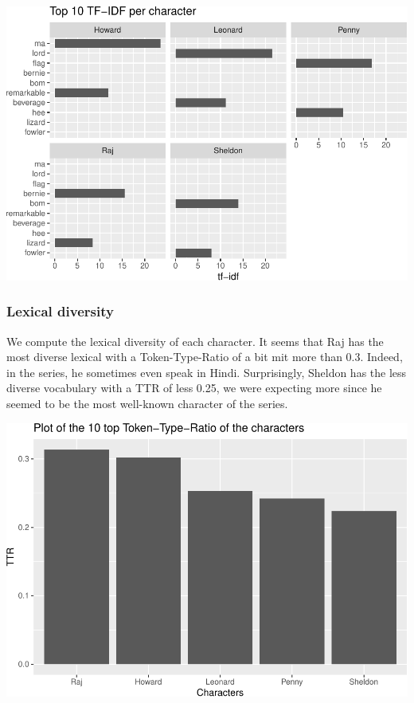\documentclass[
]{article}
\begin{document}
\includegraphics{report_files/figure-latex/unnamed-chunk-28-1.pdf}

\hypertarget{lexical-diversity-1}{%
\subsubsection{Lexical diversity}\label{lexical-diversity-1}}

We compute the lexical diversity of each character. It seems that Raj
has the most diverse lexical with a Token-Type-Ratio of a bit mit more
than 0.3. Indeed, in the series, he sometimes even speak in Hindi.
Surprisingly, Sheldon has the less diverse vocabulary with a TTR of less
0.25, we were expecting more since he seemed to be the most well-known
character of the series.

\includegraphics{report_files/figure-latex/unnamed-chunk-30-1.pdf}
\end{document}
